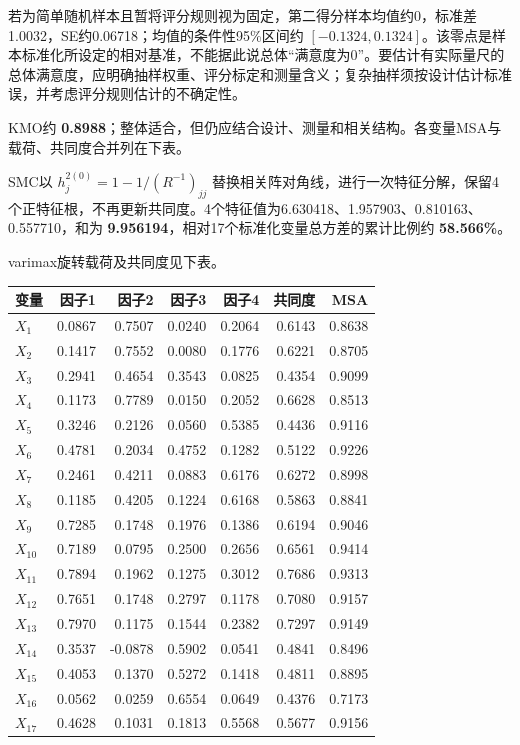 若为简单随机样本且暂将评分规则视为固定，第二得分样本均值约0，标准差1.0032，SE约0.06718；均值的条件性95\%区间约 \([-0.1324, 0.1324]\)。该零点是样本标准化所设定的相对基准，不能据此说总体``满意度为0''。要估计有实际量尺的总体满意度，应明确抽样权重、评分标定和测量含义；复杂抽样须按设计估计标准误，并考虑评分规则估计的不确定性。



KMO约 \textbf{0.8988}；整体适合，但仍应结合设计、测量和相关结构。各变量MSA与载荷、共同度合并列在下表。

SMC以 \(h_j^{2(0)}=1-1/(R^{-1})_{jj}\) 替换相关阵对角线，进行一次特征分解，保留4个正特征根，不再更新共同度。4个特征值为6.630418、1.957903、0.810163、0.557710，和为 \textbf{9.956194}，相对17个标准化变量总方差的累计比例约 \textbf{58.566\%}。

varimax旋转载荷及共同度见下表。

\begin{center}\small\setlength{\tabcolsep}{4pt}\renewcommand{\arraystretch}{1.18}\begin{tabular}{@{}lrrrrrr@{}}
\toprule
变量 & 因子1 & 因子2 & 因子3 & 因子4 & 共同度 & MSA \\
\midrule

\(X_1\) & 0.0867 & 0.7507 & 0.0240 & 0.2064 & 0.6143 & 0.8638 \\
\(X_2\) & 0.1417 & 0.7552 & 0.0080 & 0.1776 & 0.6221 & 0.8705 \\
\(X_3\) & 0.2941 & 0.4654 & 0.3543 & 0.0825 & 0.4354 & 0.9099 \\
\(X_4\) & 0.1173 & 0.7789 & 0.0150 & 0.2052 & 0.6628 & 0.8513 \\
\(X_5\) & 0.3246 & 0.2126 & 0.0560 & 0.5385 & 0.4436 & 0.9116 \\
\(X_6\) & 0.4781 & 0.2034 & 0.4752 & 0.1282 & 0.5122 & 0.9226 \\
\(X_7\) & 0.2461 & 0.4211 & 0.0883 & 0.6176 & 0.6272 & 0.8998 \\
\(X_8\) & 0.1185 & 0.4205 & 0.1224 & 0.6168 & 0.5863 & 0.8841 \\
\(X_9\) & 0.7285 & 0.1748 & 0.1976 & 0.1386 & 0.6194 & 0.9046 \\
\(X_10\) & 0.7189 & 0.0795 & 0.2500 & 0.2656 & 0.6561 & 0.9414 \\
\(X_11\) & 0.7894 & 0.1962 & 0.1275 & 0.3012 & 0.7686 & 0.9313 \\
\(X_12\) & 0.7651 & 0.1748 & 0.2797 & 0.1178 & 0.7080 & 0.9157 \\
\(X_13\) & 0.7970 & 0.1175 & 0.1544 & 0.2382 & 0.7297 & 0.9149 \\
\(X_14\) & 0.3537 & -0.0878 & 0.5902 & 0.0541 & 0.4841 & 0.8496 \\
\(X_15\) & 0.4053 & 0.1370 & 0.5272 & 0.1418 & 0.4811 & 0.8895 \\
\(X_16\) & 0.0562 & 0.0259 & 0.6554 & 0.0649 & 0.4376 & 0.7173 \\
\(X_17\) & 0.4628 & 0.1031 & 0.1813 & 0.5568 & 0.5677 & 0.9156 \\
\bottomrule\end{tabular}\end{center}

